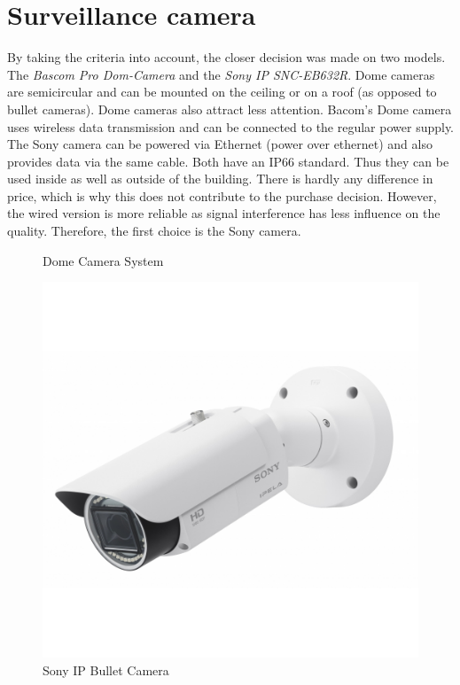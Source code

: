 \section{Surveillance camera}
By taking the criteria into account, the closer decision was made on two models. The \textit{Bascom Pro Dom-Camera} and the \textit{Sony IP SNC-EB632R}. Dome cameras are semicircular and can be mounted on the ceiling or on a roof (as opposed to bullet cameras). Dome cameras also attract less attention. Bacom's Dome camera uses wireless data transmission and can be connected to the regular power supply. The Sony camera can be powered via Ethernet (power over ethernet) and also provides data via the same cable. Both have an IP66 standard. Thus they can be used inside as well as outside of the building. There is hardly any difference in price, which is why this does not contribute to the purchase decision. However, the wired version is more reliable as signal interference has less influence on the quality. Therefore, the first choice is the Sony camera.
\begin{figure}[h]%
	\centering 
	 \hspace{1cm}
	\caption{Dome Camera System}%
	\label{fig:domeCameraSystem}%
\end{figure}

\begin{figure}[h]
	\centering
	\includegraphics[width=.5\textwidth]{images/CostAnalysis/sony-ip-bullet-kamera} 
	\caption{Sony IP Bullet Camera}
	\label{fig:sonyCamera}
\end{figure}

